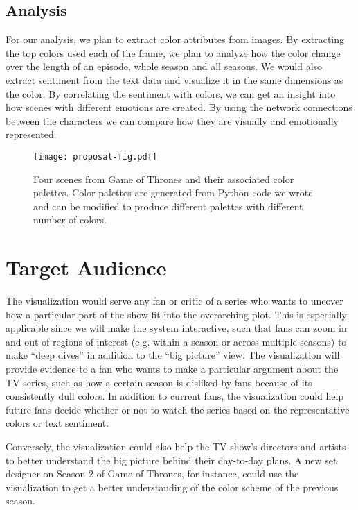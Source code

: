 \documentclass{article}
\begin{document}
\subsection*{Analysis}
For our analysis, we plan to extract color attributes from images. By extracting the top colors used each of the frame, we plan to analyze how the color change over the length of an episode, whole season and all seasons. We would also extract sentiment from the text data and visualize it in the same dimensions as the color. By correlating the sentiment with colors, we can get an insight into how scenes with different emotions are created. By using the network connections between the characters we can compare how they are visually and emotionally represented.  

\begin{figure}[h!]
\centering
\texttt{[image: proposal-fig.pdf]}
\caption{Four scenes from Game of Thrones and their associated color palettes. Color palettes are generated from Python code we wrote and can be modified to produce different palettes with different number of colors.}
\label{fig:proposal-fig}
\end{figure}

\section*{Target Audience}

The visualization would serve any fan or critic of a series who wants to uncover how a particular part of the show fit into the overarching plot. This is especially applicable since we will make the system interactive, such that fans can zoom in and out of regions of interest (e.g. within a season or across multiple seasons) to make ``deep dives'' in addition to the ``big picture'' view. The visualization will provide evidence to a fan who wants to make a particular argument about the TV series, such as how a certain season is disliked by fans because of its consistently dull colors. In addition to current fans, the  visualization could help future fans decide whether or not to watch the series based on the representative colors or text sentiment.

Conversely, the visualization could also help the TV show's directors and artists to better understand the big picture behind their day-to-day plans. A new set designer on Season 2 of Game of Thrones, for instance, could use the visualization to get a better understanding of the color scheme of the previous season.
\end{document}
